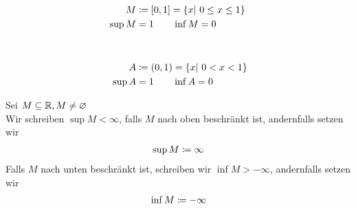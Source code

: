 \begin{beispiel}
    \theoremescape
    \begin{align*}
        M &\definedas \interv{0,1} = \set{x|~0\leq x \leq 1}\\
        \sup M &= 1 \qquad \inf M = 0\nn
        A &\definedas \pair{0,1} = \set{x|~0< x < 1}\\
        \sup A &= 1 \qquad \inf A = 0\\
    \end{align*}
\end{beispiel}

\begin{notation}
    Sei $M\subseteq \mathbb{R}, M\neq \varnothing$\\
    Wir schreiben $\sup M < \infty$, falls $M$ nach oben beschränkt ist, andernfalls setzen wir
    \begin{align*}
        \sup M \coloneqq \infty
    \end{align*}
    Falls $M$ nach unten beschränkt ist, schreiben wir $\inf M > -\infty$, andernfalls setzen wir
    \begin{align*}
        \inf M \coloneqq -\infty
    \end{align*}
\end{notation}

